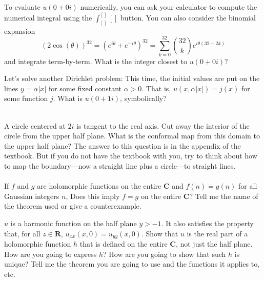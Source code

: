 \documentclass[a4paper]{article}
\def\RR{\mathbf R}
\def\CC{\mathbf C}
\begin{document}
\Problem
To evaluate $u(0 + 0i)$ numerically, you can ask your calculator
to compute the numerical integral using the $\int^{[]}_{[]} []$ button.
You can also consider the binomial expansion
\[
    (2\cos(\theta))^{32} = (e^{i\theta} + e^{-i\theta})^{32}
    = \sum_{k=0}^{32} \binom{32}{k} e^{i\theta(32 - 2k)}
\]
and integrate term-by-term.
What is the integer closest to $u(0 + 0i)$?

\Problem
Let's solve another Dirichlet problem:
This time, the initial values are put on the lines $y = \alpha|x|$
for some fixed constant $\alpha > 0$.
That is, $u(x, \alpha|x|) = j(x)$ for some function $j$.
What is $u(0 + 1i)$, symbolically?

\\[-4cm]

\hangindent=4.5cm 
\Problem
A circle centered at $2i$ is tangent to the real axis.
Cut away the interior of the circle from the upper half plane.
What is the conformal map from this domain to the upper half plane?
The answer to this question is in the appendix of the textbook.
But if you do not have the textbook with you,
try to think about how to map the boundary---now
a straight line plus a circle---to straight lines.
\\~\\
\Problem
If $f$ and $g$ are holomorphic functions on the entire $\CC$
and $f(n) = g(n)$ for all Gaussian integers $n$,
Does this imply $f = g$ on the entire $\CC$?
Tell me the name of the theorem used or give a counterexample.

\Problem
$u$ is a harmonic function on the half plane $y > -1$.
It also satisfies the property that, for all $z \in \RR$,
$u_{xx}(x, 0) = u_{yy}(x, 0)$.
Show that $u$ is the real part of a holomorphic function $h$
that is defined on the entire $\CC$, not just the half plane.
How are you going to express $h$?
How are you going to show that such $h$ is unique?
Tell me the theorem you are going to use
and the functions it applies to, etc.
\end{document}
